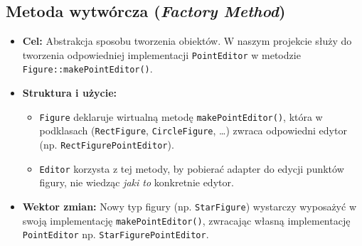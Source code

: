 \documentclass[a4paper,12pt]{article}
\begin{document}
\subsection{Metoda wytwórcza (\emph{Factory Method})}
\begin{itemize}
    \item \textbf{Cel:} Abstrakcja sposobu tworzenia obiektów. 
    W naszym projekcie służy do tworzenia odpowiedniej implementacji 
    \texttt{PointEditor} w metodzie \texttt{Figure::makePointEditor()}.
    \item \textbf{Struktura i użycie:}
    \begin{itemize}
        \item \texttt{Figure} deklaruje wirtualną metodę \texttt{makePointEditor()}, 
        która w podklasach (\texttt{RectFigure}, \texttt{CircleFigure}, \dots) zwraca
        odpowiedni edytor (np. \texttt{RectFigurePointEditor}).
        \item \texttt{Editor} korzysta z tej metody, by pobierać adapter 
        do edycji punktów figury, nie wiedząc \emph{jaki to} konkretnie edytor.
    \end{itemize}
    \item \textbf{Wektor zmian:} Nowy typ figury (np. \texttt{StarFigure}) 
    wystarczy wyposażyć w swoją implementację \texttt{makePointEditor()}, 
    zwracając własną implementację \texttt{PointEditor} np. \texttt{StarFigurePointEditor}.
\end{itemize}
\end{document}
